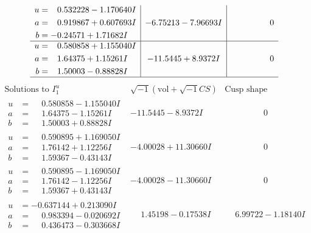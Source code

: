 \documentclass[1p]{elsarticle_modified}
\theoremstyle{definition}
\newcommand{\I}{\sqrt{-1}}
\begin{document}
$$\begin{array}{c|c|c}
\begin{aligned}
u &= \phantom{-}0.532228 - 1.170640 I \\
a &= \phantom{-}0.919867 + 0.607693 I \\
b &= -0.24571 + 1.71682 I\end{aligned}
 & -6.75213 - 7.96693 I & \phantom{-0.000000 } 0 \\ \hline\begin{aligned}
u &= \phantom{-}0.580858 + 1.155040 I \\
a &= \phantom{-}1.64375 + 1.15261 I \\
b &= \phantom{-}1.50003 - 0.88828 I\end{aligned}
 & -11.5445 + 8.9372 I & \phantom{-0.000000 } 0\\
 \hline 
 \end{array}$$\newpage$$\begin{array}{c|c|c}  
\text{Solutions to }I^u_{1}& \I (\text{vol} + \sqrt{-1}CS) & \text{Cusp shape}\\
 \hline 
\begin{aligned}
u &= \phantom{-}0.580858 - 1.155040 I \\
a &= \phantom{-}1.64375 - 1.15261 I \\
b &= \phantom{-}1.50003 + 0.88828 I\end{aligned}
 & -11.5445 - 8.9372 I & \phantom{-0.000000 } 0 \\ \hline\begin{aligned}
u &= \phantom{-}0.590895 + 1.169050 I \\
a &= \phantom{-}1.76142 + 1.12256 I \\
b &= \phantom{-}1.59367 - 0.43143 I\end{aligned}
 & -4.00028 + 11.30660 I & \phantom{-0.000000 } 0 \\ \hline\begin{aligned}
u &= \phantom{-}0.590895 - 1.169050 I \\
a &= \phantom{-}1.76142 - 1.12256 I \\
b &= \phantom{-}1.59367 + 0.43143 I\end{aligned}
 & -4.00028 - 11.30660 I & \phantom{-0.000000 } 0 \\ \hline\begin{aligned}
u &= -0.637144 + 0.213090 I \\
a &= \phantom{-}0.983394 - 0.020692 I \\
b &= \phantom{-}0.436473 - 0.303668 I\end{aligned}
 & \phantom{-}1.45198 - 0.17538 I & \phantom{-}6.99722 - 1.18140 I \\ \hline\begin{aligned}

\end{aligned}
\end{array}$$
\end{document}
